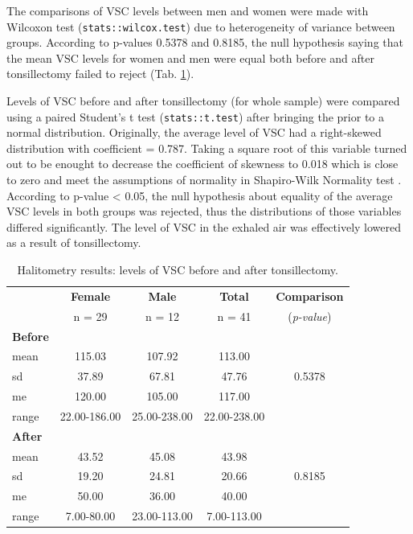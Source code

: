 \documentclass[12pt,a4paper,notitlepage]{report}
\begin{document}
The comparisons of VSC levels between men and women were made with Wilcoxon test (\texttt{stats::wilcox.test}) due to heterogeneity of variance between groups. According to p-values 0.5378 and 0.8185, the null hypothesis saying that the mean VSC levels for women and men were equal both before and after tonsillectomy failed to reject (Tab. \ref{tab:Halitometry_results}). 

Levels of VSC before and after tonsillectomy (for whole sample) were compared using a paired Student's t test (\texttt{stats::t.test}) after bringing the prior to a normal distribution. Originally, the average level of VSC had a right-skewed distribution with coefficient  = 0.787. Taking a square root of this variable turned out to be enought to decrease the coefficient of skewness to 0.018 which is close to zero and meet the assumptions of normality in Shapiro-Wilk Normality test \cite{Wilcox18}.
According to p-value < 0.05, the null hypothesis about equality of the average VSC levels in both groups was rejected, thus the distributions of those variables differed significantly. The level of VSC in the exhaled air was effectively lowered as a result of tonsillectomy.

\begin{table}[H]
\centering
	\begin{tabular}{lcccc}
	\hline 					& \textbf{Female} & \textbf{Male}	& \textbf{Total} 	&  \textbf{Comparison}  \\
	 				 		& n = 29 			& n = 12		& n = 41			&  (\textit{p-value}) \\
	\hline
	\hline
	\bf{Before}				&				&			&				&		\\
	\indent mean				& 115.03			& 107.92		& 113.00			& 		\\
	\indent sd					& 37.89			& 67.81		& 47.76			& 0.5378 \\
	\indent me				& 120.00			& 105.00		& 117.00			& 		\\
	\indent range				& 22.00-186.00 	& 25.00-238.00	 & 22.00-238.00	& 		\\
	\hline
	
	\bf{After}					&				&			&				&		\\
	\indent mean				& 43.52			& 45.08		& 43.98			& 		\\
	\indent sd					& 19.20			& 24.81		& 20.66			& 0.8185 \\
	\indent me				& 50.00			& 36.00		& 40.00 			& 		\\
	\indent range				& 7.00-80.00	 	& 23.00-113.00	& 7.00-113.00		& 		\\
	\hline
	
	\end{tabular} \\ 
	\caption{Halitometry results: levels of VSC before and after tonsillectomy.}
	\label{tab:Halitometry_results}
\end{table}
\end{document}
